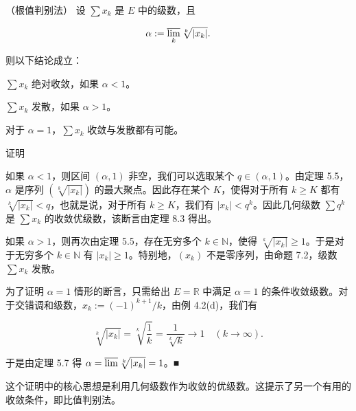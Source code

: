 \begin{theorem}

（根值判别法） 设 $ \sum x_k $ 是 $ E $ 中的级数，且

\[
\alpha:=\varlimsup_{k}\sqrt[k]{|x_{k}|}.
\]

则以下结论成立：

$ \sum x_k $ 绝对收敛，如果 $ \alpha < 1 $。

$ \sum x_k $ 发散，如果 $ \alpha > 1 $。

对于 $ \alpha = 1 $，$ \sum x_k $ 收敛与发散都有可能。

证明

\begin{items}
\item

如果 $\alpha < 1$，则区间 $(\alpha, 1)$ 非空，我们可以选取某个 $q \in (\alpha, 1)$。由定理 5.5，$\alpha$ 是序列 $\left( \sqrt[k]{|x_k|} \right)$ 的最大聚点。因此存在某个 $K$，使得对于所有 $k \geq K$ 都有 $\sqrt[k]{|x_k|} < q$，也就是说，对于所有 $k \geq K$，我们有 $|x_k| < q^k$。因此几何级数 $\sum q^k$ 是 $\sum x_k$ 的收敛优级数，该断言由定理 8.3 得出。

\item

如果 $\alpha > 1$，则再次由定理 5.5，存在无穷多个 $k \in \mathbb{N}$，使得 $\sqrt[k]{|x_k|} \geq 1$。于是对于无穷多个 $k \in \mathbb{N}$ 有 $|x_k| \geq 1$。特别地，$(x_k)$ 不是零序列，由命题 7.2，级数 $\sum x_k$ 发散。

\item

为了证明 $ \alpha = 1 $ 情形的断言，只需给出 $ E = \mathbb{R} $ 中满足 $ \alpha = 1 $ 的条件收敛级数。对于交错调和级数，$ x_k := (-1)^{k+1}/k $，由例 4.2(d)，我们有

\[
\sqrt[k]{\left|x_{k}\right|}=\sqrt[k]{\frac{1}{k}}=\frac{1}{\sqrt[k]{k}}\rightarrow1\quad(k\rightarrow\infty).
\]

于是由定理 5.7 得 $ \alpha = \varlimsup\sqrt[k]{|x_k|} = 1 $。■

\end{items}

\end{theorem}

这个证明中的核心思想是利用几何级数作为收敛的优级数。这提示了另一个有用的收敛条件，即比值判别法。


